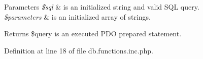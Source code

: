 \begin{DoxyParams}{Parameters}
{\em \$sql} & is an initialized string and valid S\-Q\-L query. \\
\hline
{\em \$parameters} & is an initialized array of strings. \\
\hline
\end{DoxyParams}
\begin{DoxyReturn}{Returns}
\$query is an executed P\-D\-O prepared statement. 
\end{DoxyReturn}


Definition at line 18 of file db.\-functions.\-inc.\-php.

